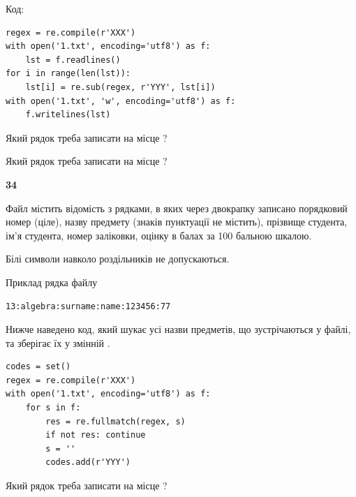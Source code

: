Код:



\begin{verbatim}
regex = re.compile(r'XXX')
with open('1.txt', encoding='utf8') as f:
    lst = f.readlines()
for i in range(len(lst)):
    lst[i] = re.sub(regex, r'YYY', lst[i])
with open('1.txt', 'w', encoding='utf8') as f:
    f.writelines(lst)
\end{verbatim}







Який рядок треба записати на місце  ?\par
\vspace{5mm}


Який рядок треба записати на місце  ?\par


\newpage

{\begin {center}\textbf{ 34}\end {center}}\par
Файл  містить відомість з рядками, в яких через двокрапку записано поряд\-ковий номер (ціле), назву предмету (знаків пунктуації не містить), прізвище студента, ім'я студента, номер заліковки, оцінку в балах за 100 бальною шкалою.

Білі символи навколо роздільників не допускаються.

Приклад рядка файлу



\begin{verbatim}
13:algebra:surname:name:123456:77
\end{verbatim}


Нижче наведено код, який шукає усі назви предметів, що зустрічаються у файлі, та зберігає їх у змінній .



\begin{verbatim}
codes = set()
regex = re.compile(r'XXX')
with open('1.txt', encoding='utf8') as f:
    for s in f:
        res = re.fullmatch(regex, s)
        if not res: continue
        s = ''
        codes.add(r'YYY')
\end{verbatim}





Який рядок треба записати на місце  ?\par
\vspace{5mm}


